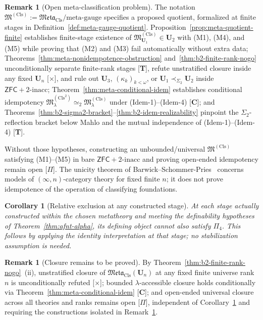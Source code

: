 \documentclass[11pt]{article}
\theoremstyle{plain}
\newtheorem{corollary}[theorem]{Corollary}
\theoremstyle{definition}
\newtheorem{remark}[theorem]{Remark}
\newcommand{\fM}{\mathfrak{M}}
\newcommand{\Meta}{\mathfrak{Meta}}
\newcommand{\ZFC}{\mathsf{ZFC}}
\begin{document}
\begin{remark}[Open meta-classification problem]\label{thm:meta-stab}
The notation $\fM^{(\mathrm{Cls})}:=\Meta_{\mathrm{Cls}}/\text{meta-gauge}$
specifies a proposed quotient, formalized at finite stages in Definition~\ref{def:meta-gauge-quotient}. Proposition~\ref{prop:meta-quotient-finite} establishes finite-stage existence of $\fM^{(\mathrm{Cls})}_{\mathbf{U}_1} \in \mathbf{U}_2$ with (M1), (M4), and (M5) while proving that (M2) and (M3) fail automatically without extra data; Theorems~\ref{thm:meta-nonidempotence-obstruction} and~\ref{thm:b2-finite-rank-nogo} unconditionally separate finite-rank stages \textup{[\textbf{T}]}, refute unstratified closure inside any fixed $\mathbf{U}_n$ \textup{[\textbf{$\times$}]}, and rule out $\mathbf{U}_3$, $(\kappa_k)_{k < \omega}$, or $\mathbf{U}_1 \prec_{\Sigma_2} \mathbf{U}_2$ inside $\ZFC + 2\text{-inacc}$; Theorem~\ref{thm:meta-conditional-idem} establishes conditional idempotency $\fM^{(\mathrm{Cls}^2)}_\lambda \simeq_2 \fM^{(\mathrm{Cls})}_\lambda$ under (Idem-1)--(Idem-4) \textup{[\textbf{C}]}; and Theorems~\ref{thm:b2-sigma2-bracket}--\ref{thm:b2-idem-realizability} pinpoint the $\Sigma_2$-reflection bracket below Mahlo and the mutual independence of (Idem-1)--(Idem-4) \textup{[\textbf{T}]}.

Without those hypotheses, constructing an unbounded/universal $\fM^{(\mathrm{Cls})}$ satisfying (M1)--(M5) in bare $\ZFC + 2\text{-inacc}$ and proving open-ended idempotency remain open \textup{[\textbf{$\Pi$}]}. The unicity theorem of Barwick--Schommer-Pries~\cite{BarwickSchommerPries2021} concerns models of $(\infty,n)$-category theory for fixed finite $n$; it does not prove idempotence of the operation of classifying foundations.
\end{remark}

\begin{corollary}[Relative exclusion at any constructed stage]\label{cor:iteration-closure}
At each stage actually constructed within the chosen metatheory and meeting
the definability hypotheses of Theorem~\ref{thm:afnt-alpha}, its defining
object cannot also satisfy $\Pi_4$. This follows by applying the identity
interpretation at that stage; no stabilization assumption is needed.
\end{corollary}

\begin{remark}[Closure remains to be proved]\label{cor:meta-closure}
By Theorem~\ref{thm:b2-finite-rank-nogo}~(ii), unstratified closure of $\Meta_{\mathrm{Cls}}(\mathbf{U}_n)$ at any fixed finite universe rank $n$ is unconditionally refuted \textup{[\textbf{$\times$}]}; bounded $\lambda$-accessible closure holds conditionally via Theorem~\ref{thm:meta-conditional-idem} \textup{[\textbf{C}]}; and open-ended universal closure across all theories and ranks remains open \textup{[\textbf{$\Pi$}]}, independent of Corollary~\ref{cor:iteration-closure} and requiring the constructions isolated in Remark~\ref{thm:meta-stab}.
\end{remark}
\end{document}
